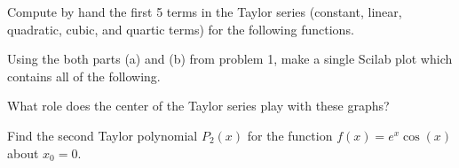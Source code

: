 \documentclass[addpoints, 11pt]{exam}
\begin{document}
\begin{questions}


\question Compute by hand the first 5 terms in the Taylor series (constant, linear, quadratic, cubic, and quartic terms) for the following functions.

\question Using the both parts (a) and (b) from problem 1, make a single Scilab plot which contains all of the following. 
What role does the center of the Taylor series play with these graphs?

\question Find the second Taylor polynomial $P_2(x)$ for the function $f(x)=e^x\cos(x)$ about $x_0=0$.
\end{questions}
\end{document}
